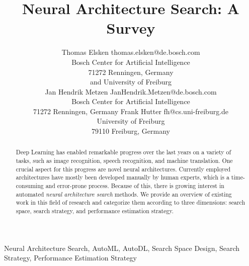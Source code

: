 \documentclass[twoside,11pt]{article}
\begin{document}
	\title{Neural Architecture Search: A Survey}
\author{\name Thomas Elsken \email thomas.elsken@de.bosch.com \\
       \addr Bosch Center for Artificial Intelligence\\
       71272 Renningen, Germany \\ and University of Freiburg  \\
       \AND
       \name Jan Hendrik Metzen \email JanHendrik.Metzen@de.bosch.com \\
        \addr Bosch Center for Artificial Intelligence\\
       71272 Renningen, Germany
       \AND
       \name Frank Hutter \email fh@cs.uni-freiburg.de \\
        \addr University of Freiburg\\
        79110 Freiburg, Germany}
        
        
        

	\maketitle              %

	
	\begin{abstract}%
	    	Deep Learning has enabled remarkable progress over the last years on a variety of tasks, such as image recognition, speech recognition, and machine translation. One crucial aspect for this progress are novel neural architectures. Currently employed architectures have mostly been developed manually by human experts, which is a time-consuming and error-prone process. Because of this, there is growing interest in automated \emph{neural architecture search} methods. We provide an overview of existing work in this field of research and categorize them according to three dimensions: search space, search strategy, and performance estimation strategy.


	\end{abstract}

\begin{keywords}
Neural Architecture Search, AutoML, AutoDL, Search Space Design, Search Strategy, Performance Estimation Strategy
\end{keywords}
\end{document}
